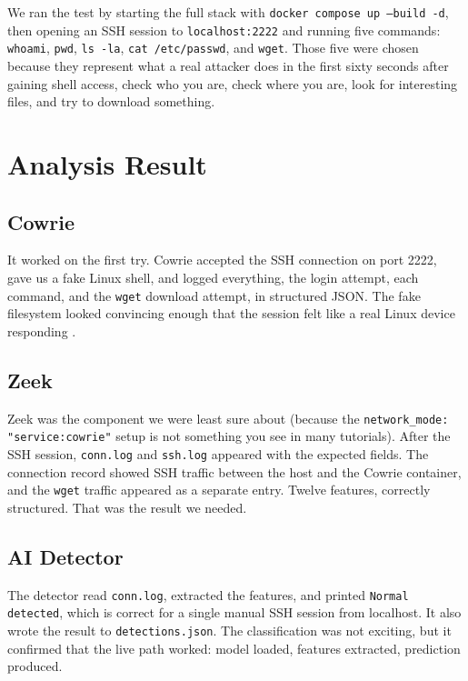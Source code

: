 We ran the test by starting the full stack with \texttt{docker compose up --build -d}, then opening an SSH session to \texttt{localhost:2222} and running five commands: \texttt{whoami}, \texttt{pwd}, \texttt{ls -la}, \texttt{cat /etc/passwd}, and \texttt{wget}. Those five were chosen because they represent what a real attacker does in the first sixty seconds after gaining shell access, check who you are, check where you are, look for interesting files, and try to download something.

\section{Analysis Result}
\label{sec:analysis_result}

\subsection*{Cowrie}

It worked on the first try. Cowrie accepted the SSH connection on port 2222, gave us a fake Linux shell, and logged everything, the login attempt, each command, and the \texttt{wget} download attempt, in structured JSON. The fake filesystem looked convincing enough that the session felt like a real Linux device responding \cite{9071014,9359711}.

\subsection*{Zeek}

Zeek was the component we were least sure about (because the \texttt{network\_mode: "service:cowrie"} setup is not something you see in many tutorials). After the SSH session, \texttt{conn.log} and \texttt{ssh.log} appeared with the expected fields. The connection record showed SSH traffic between the host and the Cowrie container, and the \texttt{wget} traffic appeared as a separate entry. Twelve features, correctly structured. That was the result we needed.

\subsection*{AI Detector}

The detector read \texttt{conn.log}, extracted the features, and printed \texttt{Normal detected}, which is correct for a single manual SSH session from localhost. It also wrote the result to \texttt{detections.json}. The classification was not exciting, but it confirmed that the live path worked: model loaded, features extracted, prediction produced.

